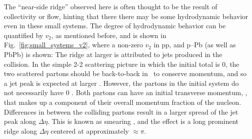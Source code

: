  The ``near-side ridge'' observed here is often thought to be the result of collectivity or flow, hinting that there there may be some hydrodynamic behavior even in these small systems. The degree of hydrodynamic behavior can be quantified by $v_2$, as mentioned before, and is shown in Fig.~\ref{fig:small_systems_v2}, where a non-zero  $v_2$ in pp, and p--Pb (as well as PbPb) is shown:
 The ridge at larger \deltaphi is attributed to jets produced in the collision. In the simple 2-2 scattering picture in which the initial total \pt is 0, the two scattered partons should be back-to-back in \deltaphi~to conserve momentum, and so a jet peak is expected at larger \deltaphi. However, the partons in the initial system  do not necessarily have 0 \pt. Both partons can have an initial transverse momentum, \kt, that makes up a component of their overall momentum fraction of the nucleon. Differences in \kt between the colliding partons result in a larger spread of the jet peak along $\Delta\eta$. This is known as \kt smearing \cite{PHENIXCollaboration2006}, and the effect is a long prominent ridge along  $\Delta\eta$ centered at approximately \deltaphi$\approx \pi$.
